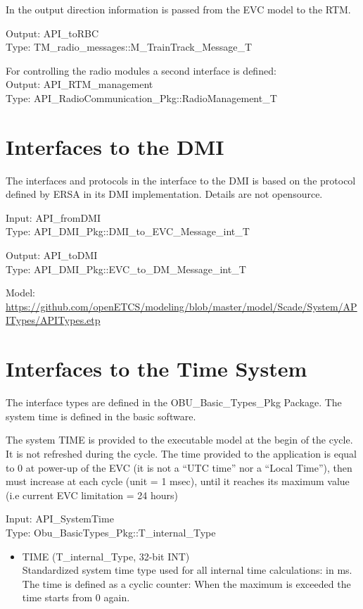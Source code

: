 \documentclass{template/openetcs_report}
\begin{document}
In the output direction information is passed from the EVC model to the RTM.

Output: API\_toRBC\\
Type: TM\_radio\_messages::M\_TrainTrack\_Message\_T

For controlling the radio modules a second interface is defined:\\
Output: API\_RTM\_management\\
Type: API\_RadioCommunication\_Pkg::RadioManagement\_T

\section{Interfaces to the DMI}

The interfaces and protocols in the interface to the DMI is based on the protocol defined by ERSA in its DMI implementation. Details are not opensource.

Input: API\_fromDMI\\
Type: API\_DMI\_Pkg::DMI\_to\_EVC\_Message\_int\_T

Output: API\_toDMI\\
Type: API\_DMI\_Pkg::EVC\_to\_DM\_Message\_int\_T

Model: \url{https://github.com/openETCS/modeling/blob/master/model/Scade/System/APITypes/APITypes.etp}

\section{Interfaces to the Time System}
The interface types are defined in the OBU\_Basic\_Types\_Pkg Package. The system time is defined in the basic software.

The system TIME is provided to the executable model at the begin of the cycle. It is not refreshed during the cycle. The time provided to the application is equal to 0 at power-up of the EVC (it is not a “UTC time” nor a “Local
Time”), then must increase at each cycle (unit = 1 msec), until it reaches its maximum value (i.e current EVC
limitation = 24 hours)

Input: API\_SystemTime\\
Type: Obu\_BasicTypes\_Pkg::T\_internal\_Type

\begin{itemize}
\item TIME (T\_internal\_Type, 32-bit INT)\\
Standardized system time type used for all internal time calculations: in ms. The time is defined as a cyclic counter: When the maximum is exceeded the time starts from 0 again. 
\end{itemize}
\end{document}
